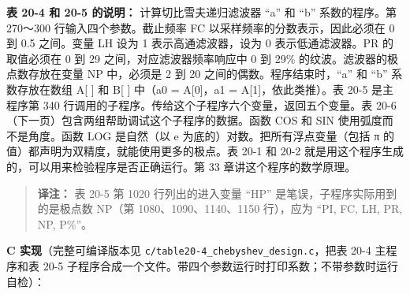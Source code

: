 \textbf{表 20-4 和 20-5 的说明：} 计算切比雪夫递归滤波器 ``a'' 和 ``b''
系数的程序。第 270～300 行输入四个参数。截止频率 FC
以采样频率的分数表示，因此必须在 0 到 0.5 之间。变量 LH 设为 1
表示高通滤波器，设为 0 表示低通滤波器。PR 的取值必须在 0 到 29
之间，对应滤波器频率响应中 0 到 29\% 的纹波。滤波器的极点数存放在变量 NP
中，必须是 2 到 20 之间的偶数。程序结束时，``a'' 和 ``b'' 系数存放在数组
A{[} {]} 和 B{[} {]} 中（a0 = A{[}0{]}，a1 = A{[}1{]}，依此类推）。表
20-5 是主程序第 340
行调用的子程序。传给这个子程序六个变量，返回五个变量。表
20-6（下一页）包含两组帮助调试这个子程序的数据。函数 COS 和 SIN
使用弧度而不是角度。函数 LOG 是自然（以 e
为底的）对数。把所有浮点变量（包括 π
的值）都声明为双精度，就能使用更多的极点。表 20-1 和 20-2
就是用这个程序生成的，可以用来检验程序是否正确运行。第 33
章讲这个程序的数学原理。

\begin{quote}
\textbf{译注：} 表 20-5 第 1020 行列出的进入变量 ``HP''
是笔误，子程序实际用到的是极点数 NP（第 1080、1090、1140、1150
行），应为 ``PI, FC, LH, PR, NP, P\%''。
\end{quote}

\textbf{C 实现}（完整可编译版本见
\texttt{c/table20-4\_chebyshev\_design.c}，把表 20-4 主程序和表 20-5
子程序合成一个文件。带四个参数运行时打印系数；不带参数时运行自检）：

